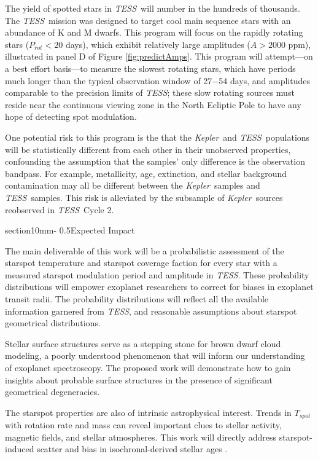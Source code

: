 \documentclass[letterpaper,11pt]{article}
\makeatletter
\renewcommand{\section}{\@startsection%
{section}{1}{0mm}{-\baselineskip}%
{0.5\baselineskip}{\normalfont\Large\bfseries}}%
\newcommand{\tess}{{\it TESS}}
\newcommand{\kepler}{{\it Kepler}}
\makeatother
\begin{document}
The yield of spotted stars in \tess\ will number in the hundreds of thousands.  The \tess\ mission was designed to target cool main sequence stars with an abundance of K and M dwarfs.  This program will focus on the rapidly rotating stars ($P_{rot}<20$ days), which exhibit relatively large amplitudes ($A>2000$ ppm), illustrated in panel D of Figure \ref{fig:predictAmps}.  This program will attempt---on a best effort basis---to measure the slowest rotating stars, which have periods much longer than the typical observation window of 27$-$54 days, and amplitudes comparable to the precision limits of \tess; these slow rotating sources must reside near the continuous viewing zone in the North Ecliptic Pole to have any hope of detecting spot modulation.

One potential risk to this program is the that the \kepler\ and \tess\ populations will be statistically different from each other in their unobserved properties, confounding the assumption that the samples' only difference is the observation bandpass.  For example, metallicity, age, extinction, and stellar background contamination may all be different between the \kepler\ samples and \tess\ samples.  This risk is alleviated by the subsample of \kepler\ sources reobserved in \tess\ Cycle 2.

\section{Expected Impact}

The main deliverable of this work will be a probabilistic assessment of the starspot temperature and starspot coverage faction for every star with a measured starspot modulation period and amplitude in \tess.  These probability distributions will empower exoplanet researchers to correct for biases in exoplanet transit radii.  The probability distributions will reflect all the available information garnered from \tess, and reasonable assumptions about starspot geometrical distributions.

Stellar surface structures serve as a stepping stone for brown dwarf cloud modeling, a poorly understood phenomenon that will inform our understanding of exoplanet spectroscopy.  The proposed work will demonstrate how to gain insights about probable surface structures in the presence of significant geometrical degeneracies.

The starspot properties are also of intrinsic astrophysical interest.  Trends in $T_{spot}$ with rotation rate and mass can reveal important clues to stellar activity, magnetic fields, and stellar atmospheres.  This work will directly address starspot-induced scatter and bias in isochronal-derived stellar ages \citep{2015ApJ...807..174S, 2017ApJ...836..200G}.
\end{document}
